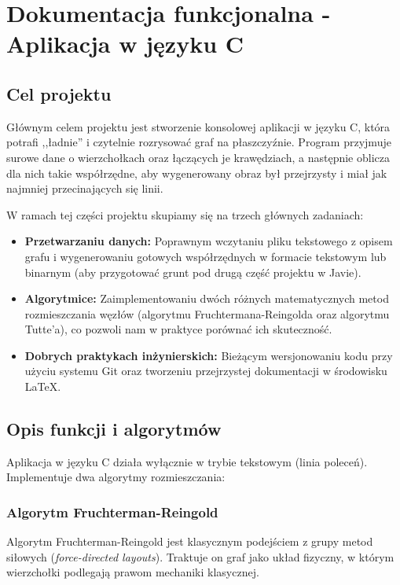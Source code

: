 \documentclass[12pt,a4paper]{article}
\begin{document}
\section{Dokumentacja funkcjonalna - Aplikacja w języku C}

\subsection{Cel projektu}

Głównym celem projektu jest stworzenie konsolowej aplikacji w języku C, która potrafi ,,ładnie'' i czytelnie rozrysować graf na płaszczyźnie. Program przyjmuje surowe dane o wierzchołkach oraz łączących je krawędziach, a następnie oblicza dla nich takie współrzędne, aby wygenerowany obraz był przejrzysty i miał jak najmniej przecinających się linii.

W ramach tej części projektu skupiamy się na trzech głównych zadaniach:
\begin{itemize}
    \item \textbf{Przetwarzaniu danych:} Poprawnym wczytaniu pliku tekstowego z opisem grafu i wygenerowaniu gotowych współrzędnych w formacie tekstowym lub binarnym (aby przygotować grunt pod drugą część projektu w Javie).
    \item \textbf{Algorytmice:} Zaimplementowaniu dwóch różnych matematycznych metod rozmieszczania węzłów (algorytmu Fruchtermana-Reingolda oraz algorytmu Tutte'a), co pozwoli nam w praktyce porównać ich skuteczność.
    \item \textbf{Dobrych praktykach inżynierskich:} Bieżącym wersjonowaniu kodu przy użyciu systemu Git oraz tworzeniu przejrzystej dokumentacji w środowisku \LaTeX.
\end{itemize}

\subsection{Opis funkcji i algorytmów}
Aplikacja w języku C działa wyłącznie w trybie tekstowym (linia poleceń). Implementuje dwa algorytmy rozmieszczania:

\subsubsection{Algorytm Fruchterman-Reingold}

Algorytm Fruchterman-Reingold jest klasycznym podejściem z grupy metod siłowych (\textit{force-directed layouts}). Traktuje on graf jako układ fizyczny, w którym wierzchołki podlegają prawom mechaniki klasycznej.
\end{document}
